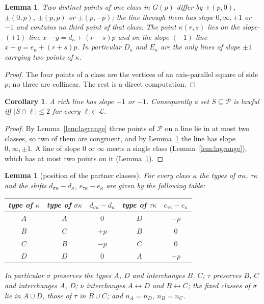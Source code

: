 \documentclass[11pt]{article}
\newtheorem{lemma}[theorem]{Lemma}
\newtheorem{corollary}[theorem]{Corollary}
\theoremstyle{remark}
\newcommand{\Gp}{G(p)}
\newcommand{\Lc}{\mathcal{L}}
\newcommand{\Pset}{\mathcal{P}}
\begin{document}
\begin{lemma}\label{lem:copies}
Two distinct points of one class in $\Gp$ differ by $\pm(p,0)$, $\pm(0,p)$, $\pm(p,p)$ or $\pm(p,-p)$; the line
through them has slope $0,\infty,+1$ or $-1$ and contains no third point of that class.  The point $\kappa(r,s)$ lies
on the slope-$(+1)$ line $x-y=d_\kappa+(r-s)p$ and on the slope-$(-1)$ line $x+y=e_\kappa+(r+s)p$.  In particular
$D_\kappa$ and $E_\kappa$ are the only lines of slope $\pm1$ carrying two points of $\kappa$.
\end{lemma}

\begin{proof}
The four points of a class are the vertices of an axis-parallel square of side $p$; no three are collinear.
The rest is a direct computation.
\end{proof}

\begin{corollary}\label{cor:slopes}
A rich line has slope $+1$ or $-1$.  Consequently a set $S\subseteq\Pset$ is lawful iff $|S\cap\ell|\le2$ for every
$\ell\in\Lc$.
\end{corollary}

\begin{proof}
By Lemma~\ref{lem:lagrange} three points of $\Pset$ on a line lie in at most two classes, so two of them are congruent,
and by Lemma~\ref{lem:copies} the line has slope $0,\infty,\pm1$.  A line of slope $0$ or $\infty$ meets a single class
(Lemma~\ref{lem:lagrange}), which has at most two points on it (Lemma~\ref{lem:copies}).
\end{proof}

\begin{lemma}[position of the partner classes]\label{lem:partners}
For every class $\kappa$ the types of $\sigma\kappa$, $\tau\kappa$ and the shifts $d_{\sigma\kappa}-d_\kappa$,
$e_{\tau\kappa}-e_\kappa$ are given by the following table:
\begin{center}
\begin{tabular}{c|cc|cc}
\toprule
type of $\kappa$ & type of $\sigma\kappa$ & $d_{\sigma\kappa}-d_\kappa$ & type of $\tau\kappa$ & $e_{\tau\kappa}-e_\kappa$\\
\midrule
$A$ & $A$ & $0$ & $D$ & $-p$\\
$B$ & $C$ & $+p$ & $B$ & $0$\\
$C$ & $B$ & $-p$ & $C$ & $0$\\
$D$ & $D$ & $0$ & $A$ & $+p$\\
\bottomrule
\end{tabular}
\end{center}
In particular $\sigma$ preserves the types $A$, $D$ and interchanges $B$, $C$; $\tau$ preserves $B$, $C$ and
interchanges $A$, $D$; $\nu$ interchanges $A\leftrightarrow D$ and $B\leftrightarrow C$; the fixed classes of $\sigma$
lie in $A\cup D$, those of $\tau$ in $B\cup C$; and $n_A=n_D$, $n_B=n_C$.
\end{lemma}
\end{document}
